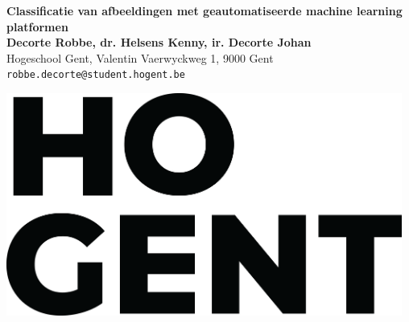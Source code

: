 \documentclass[a0,portrait]{a0poster}
\begin{document}


\begin{minipage}[t]{0.75\linewidth}
\VeryHuge \color{HoGentAccent1} \textbf{Classificatie van afbeeldingen met geautomatiseerde machine learning platformen} \color{Black}\\[2.4cm] %
\Huge \textbf{Decorte Robbe, dr. Helsens Kenny, ir. Decorte Johan}\\[0.5cm] %
\huge Hogeschool Gent, Valentin Vaerwyckweg 1, 9000 Gent\\[0.4cm] %
\Large \texttt{robbe.decorte@student.hogent.be} \\
\end{minipage}
%
\begin{minipage}[t]{0.25\linewidth}
\includegraphics[width=13cm,right]{figures/HOGENT_Logo_Pos_rgb.png} 

\end{minipage}

\vspace{1cm} %

\end{document}
